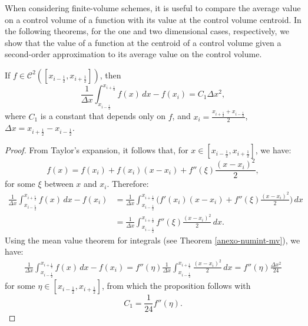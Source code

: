 When considering finite-volume schemes, it is useful to compare the average value on a  control volume 
of a function with its value at the  control volume centroid. 
In the following theorems, for the one and two dimensional cases, respectively,
we show that the value of a function at the centroid of a control volume given a second-order approximation to its average value
on the control volume.
\begin{thrm}
	\label{prop-bound-midpoint1d}
	If $f \in \mathcal{C}^2([x_{i-\frac{1}{2}},x_{i+\frac{1}{2}}])$, then 
	\begin{equation}
		\frac{1}{\Delta x}\int_{x_{i-\frac{1}{2}}}^{x_{i+\frac{1}{2}}}{f(x)\,dx}-f(x_i) = C_1 \Delta x^2, 
	\end{equation}
	where $C_1$ is a constant that depends only on $f$, and $x_i = \frac{x_{i+\frac{1}{2}} + x_{i-\frac{1}{2}}}{2}$,
	$\Delta x = x_{i+\frac{1}{2}}-x_{i-\frac{1}{2}}$.
\end{thrm}
\begin{proof}
	From Taylor's expansion, it follows that, for $x \in [x_{i-\frac{1}{2}},x_{i+\frac{1}{2}}]$, we have:
	\begin{equation}
		f(x) = f(x_i) +  f(x_i)(x-x_i) + f''(\xi)\frac{(x-x_i)^2}{2},
	\end{equation}
	for some $\xi$ between $x$ and $x_i$. Therefore:
	\begin{align*}
		\frac{1}{\Delta x} \int_{x_{i-\frac{1}{2}}}^{x_{i+\frac{1}{2}}} {f(x)\,dx} - f(x_i)  
		&= \frac{1}{\Delta x} \int_{x_{i-\frac{1}{2}}}^{x_{i+\frac{1}{2}}} 
		\bigg( f'(x_i)(x-x_i) + f''(\xi)\frac{(x-x_i)^2}{2} \bigg) \,dx \\ 
		&=  \frac{1}{\Delta x} \int_{x_{i-\frac{1}{2}}}^{x_{i+\frac{1}{2}}} 
		f''(\xi)\frac{(x-x_i)^2}{2}  \,dx.
	\end{align*}
	Using the mean value theorem for integrals (see Theorem \ref{anexo-numint-mv}), we have:
	\begin{align*}
		\frac{1}{\Delta x} \int_{x_{i-\frac{1}{2}}}^{x_{i+\frac{1}{2}}} {f(x)\,dx} - f(x_i)  = 
		f''(\eta) \frac{1}{\Delta x} \int_{x_{i-\frac{1}{2}}}^{x_{i+\frac{1}{2}}} 
		\frac{(x-x_i)^2}{2}  \,dx = f''(\eta)\frac{\Delta x^2}{24}
	\end{align*}	
	for some $\eta \in [x_{i-\frac{1}{2}},x_{i+\frac{1}{2}}]$, from which the proposition follows with
	\begin{equation}
		C_1 = \frac{1}{24}f''(\eta).
	\end{equation}
\end{proof}


